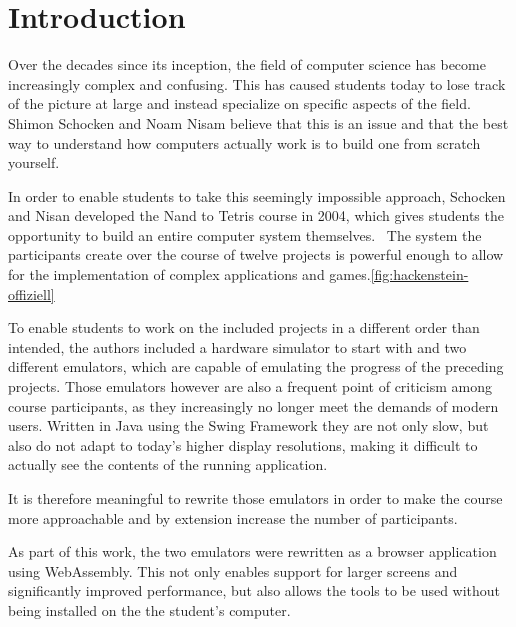 \section{Introduction}

Over the decades since its inception, the field of computer science has become increasingly complex and confusing.
This has caused students today to lose track of the picture at large and instead specialize on specific aspects of the field.
Shimon Schocken and Noam Nisam believe that this is an issue and that the best way to understand how computers actually work is to build one from scratch yourself.~\cite[Preface]{nisan2005}

In order to enable students to take this seemingly impossible approach, Schocken and Nisan developed the Nand to Tetris course in 2004, which gives students the opportunity to build an entire computer system themselves.~\cite{1408798}
The system the participants create over the course of twelve projects is powerful enough to allow for the implementation of complex applications and games.\ref{fig:hackenstein-offiziell}

To enable students to work on the included projects in a different order than intended, the authors included a hardware simulator to start with and two different emulators, which are capable of emulating the progress of the preceding projects.
Those emulators however are also a frequent point of criticism among course participants, as they increasingly no longer meet the demands of modern users.
Written in Java using the Swing Framework they are not only slow, but also do not adapt to today's higher display resolutions, making it difficult to actually see the contents of the running application.

It is therefore meaningful to rewrite those emulators in order to make the course more approachable and by extension increase the number of participants.

As part of this work, the two emulators were rewritten as a browser application using WebAssembly. This not only enables support for larger screens and significantly improved performance, but also allows the tools to be used without being installed on the the student's computer.
